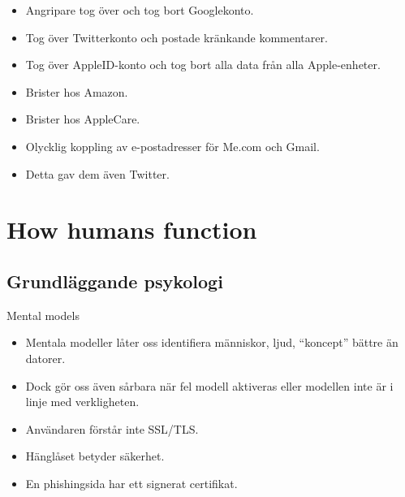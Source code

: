 \documentclass{beamer}
\begin{document}
\begin{frame}
  \begin{example}
    \begin{itemize}
      \item Angripare tog över och tog bort Googlekonto.
      \item Tog över Twitterkonto och postade kränkande kommentarer.
      \item Tog över AppleID-konto och tog bort alla data från alla 
        Apple-enheter.
    \end{itemize}
  \end{example}
\end{frame}

\begin{frame}
  \begin{example}
    \begin{itemize}
      \item Brister hos Amazon.
      \item Brister hos AppleCare.
      \item Olycklig koppling av e-postadresser för Me.com och Gmail.
      \item Detta gav dem även Twitter.
    \end{itemize}
  \end{example}
\end{frame}


\section{How humans function}

\subsection{Grundläggande psykologi}

\begin{frame}
  \begin{block}{Mental models}
    \begin{itemize}
      \item Mentala modeller låter oss identifiera människor, ljud, 
        \enquote{koncept} bättre än datorer.

      \item Dock gör oss även sårbara när fel modell aktiveras eller modellen 
        inte är i linje med verkligheten.
    \end{itemize}
  \end{block}

  \pause{}

  \begin{example}
    \begin{itemize}
      \item Användaren förstår inte SSL/TLS\@.
      \item Hänglåset betyder säkerhet.
      \item En phishingsida har ett signerat certifikat.
    \end{itemize}
  \end{example}
\end{frame}
\end{document}
